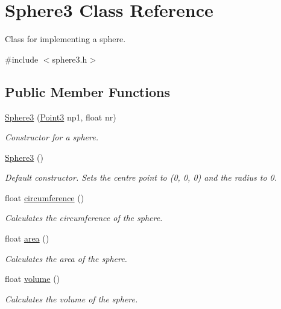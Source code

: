 \hypertarget{class_sphere3}{}\section{Sphere3 Class Reference}
\label{class_sphere3}


Class for implementing a sphere.  




{\ttfamily \#include $<$sphere3.\+h$>$}

\subsection*{Public Member Functions}
\begin{DoxyCompactItemize}
\item 
\mbox{\hyperlink{class_sphere3_af70e61fde5085502a572acb306f968cd}{Sphere3}} (\mbox{\hyperlink{class_point3}{Point3}} np1, float nr)
\begin{DoxyCompactList}\small\item\em Constructor for a sphere. \end{DoxyCompactList}\item 
\mbox{\hyperlink{class_sphere3_a0231ba10d45f03ca7ab21cbd525339f5}{Sphere3}} ()
\begin{DoxyCompactList}\small\item\em Default constructor. Sets the centre point to (0, 0, 0) and the radius to 0. \end{DoxyCompactList}\item 
float \mbox{\hyperlink{class_sphere3_af78dd4f8db67d9492926a7cec73c000e}{circumference}} ()
\begin{DoxyCompactList}\small\item\em Calculates the circumference of the sphere. \end{DoxyCompactList}\item 
float \mbox{\hyperlink{class_sphere3_a9921044730d62a06748f74bfa33512fe}{area}} ()
\begin{DoxyCompactList}\small\item\em Calculates the area of the sphere. \end{DoxyCompactList}\item 
float \mbox{\hyperlink{class_sphere3_af89fd0ff023ebedc783e9740554b32d7}{volume}} ()
\begin{DoxyCompactList}\small\item\em Calculates the volume of the sphere. \end{DoxyCompactList}\item 

\end{DoxyCompactItemize}
